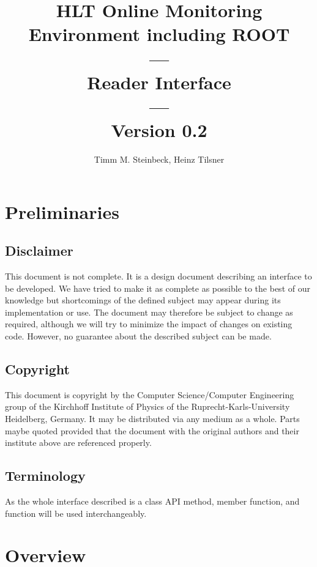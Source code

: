 \documentclass[a4paper,twoside]{article}
\title{HLT Online Monitoring Environment including ROOT \\ --- \\ Reader Interface \\ --- \\ Version 0.2}
\author{Timm M. Steinbeck, Heinz Tilsner}
\begin{document}
\maketitle

\section{Preliminaries}
\subsection{Disclaimer}
This document is not complete. It is a design document describing an interface to be developed. We have tried to make it as complete as possible to the best of our knowledge but shortcomings of the defined subject may appear during its implementation or use.
The document may therefore be subject to change as required, although we will try to minimize the impact of changes on existing code. 
However, no guarantee about the described subject can be made.
\subsection{Copyright}
This document is copyright by the Computer Science/Computer Engineering group of the Kirchhoff Institute of Physics of the Ruprecht-Karls-University Heidelberg, Germany. It may be distributed 
via any medium as a whole. Parts maybe quoted provided that the document with the original authors and their institute above are referenced properly. 
\subsection{Terminology}
As the whole interface described is a class API method, member function, and function will be used interchangeably.

\section{Overview}
\end{document}
